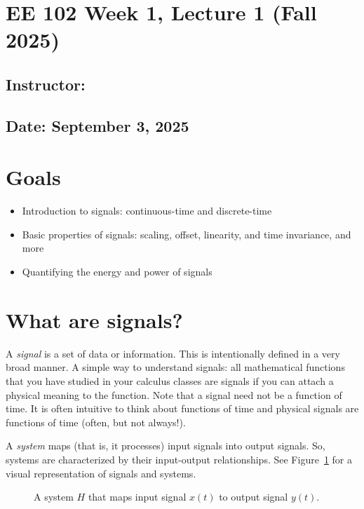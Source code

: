 \documentclass{ee102_notes}
\renewcommand{\releasedate}{September 3, 2025}
\begin{document}
\section*{EE 102 Week 1, Lecture 1 (Fall 2025)}
\subsection*{Instructor: \instructor}
\subsection*{Date: \releasedate}
\section{Goals}
\begin{itemize}
  \item Introduction to signals: continuous-time and discrete-time
  \item Basic properties of signals: scaling, offset, linearity, and time invariance, and more
  \item Quantifying the energy and power of signals
\end{itemize}

\section{What are signals?}
A \emph{signal} is a set of data or information. This is intentionally defined in a very broad manner. A simple way to understand signals: all mathematical functions that you have studied in your calculus classes are signals if you can attach a physical meaning to the function. Note that a signal need not be a function of time. It is often intuitive to think about functions of time and physical signals are functions of time (often, but not always!).

A \emph{system} maps (that is, it processes) input signals into output signals. So, systems are characterized by their input-output relationships. See Figure~\ref{fig:system} for a visual representation of signals and systems.
\begin{figure}[h]
  \centering
{} 
 \caption{A system $H$ that maps input signal $x(t)$ to output signal $y(t)$.}
  \label{fig:system}
\end{figure}
\end{document}
